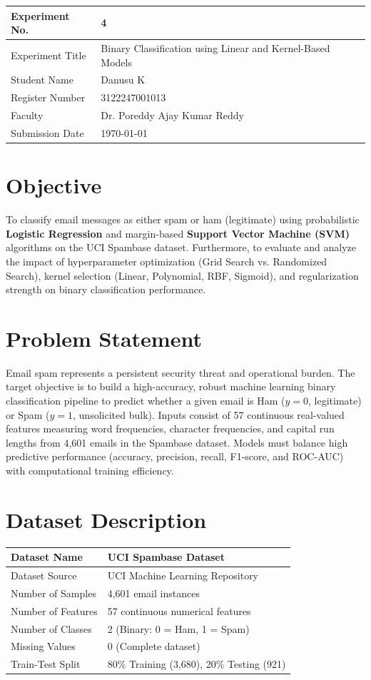\documentclass[12pt,a4paper]{article}
\begin{document}
\begin{tabular}{|p{4cm}|p{11cm}|}
\hline
Experiment No. & 4 \\ \hline
Experiment Title & Binary Classification using Linear and Kernel-Based Models\footnotemark \\ \hline
Student Name & Danusu K \\ \hline
Register Number & 3122247001013 \\ \hline
Faculty & Dr. Poreddy Ajay Kumar Reddy \\ \hline
Submission Date & \today \\ \hline
\end{tabular}

\section{Objective}
To classify email messages as either spam or ham (legitimate) using probabilistic \textbf{Logistic Regression} and margin-based \textbf{Support Vector Machine (SVM)} algorithms on the UCI Spambase dataset. Furthermore, to evaluate and analyze the impact of hyperparameter optimization (Grid Search vs. Randomized Search), kernel selection (Linear, Polynomial, RBF, Sigmoid), and regularization strength on binary classification performance.

\section{Problem Statement}
Email spam represents a persistent security threat and operational burden. The target objective is to build a high-accuracy, robust machine learning binary classification pipeline to predict whether a given email is Ham ($y = 0$, legitimate) or Spam ($y = 1$, unsolicited bulk). Inputs consist of 57 continuous real-valued features measuring word frequencies, character frequencies, and capital run lengths from 4,601 emails in the Spambase dataset. Models must balance high predictive performance (accuracy, precision, recall, F1-score, and ROC-AUC) with computational training efficiency.

\section{Dataset Description}
\begin{longtable}{|p{6cm}|p{8cm}|}
\hline
Dataset Name & UCI Spambase Dataset \\ \hline
Dataset Source & UCI Machine Learning Repository \\ \hline
Number of Samples & 4,601 email instances \\ \hline
Number of Features & 57 continuous numerical features \\ \hline
Number of Classes & 2 (Binary: 0 = Ham, 1 = Spam) \\ \hline
Missing Values & 0 (Complete dataset) \\ \hline
Train-Test Split & 80\% Training (3,680), 20\% Testing (921) \\ \hline
\end{longtable}
\end{document}
